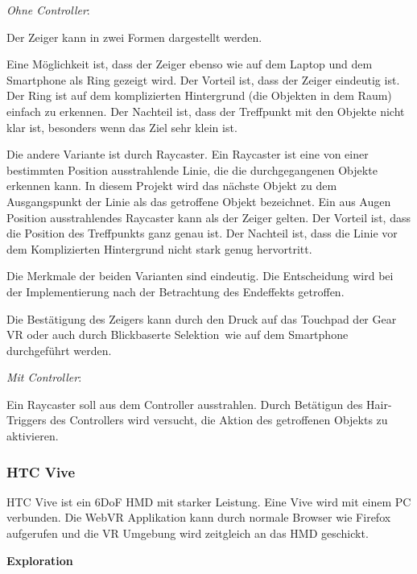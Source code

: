   \noindent
  \textsl{Ohne Controller}:
  \vspace{0.5em}
  
  \noindent
  Der Zeiger kann in zwei Formen dargestellt werden.
  
  Eine Möglichkeit ist, dass der Zeiger ebenso wie auf dem Laptop und dem Smartphone als Ring gezeigt wird. Der Vorteil ist, dass der Zeiger eindeutig ist. Der Ring ist auf dem komplizierten Hintergrund (die Objekten in dem Raum) einfach zu erkennen. Der Nachteil ist, dass der Treffpunkt mit den Objekte nicht klar ist, besonders wenn das Ziel sehr klein ist.
  
  Die andere Variante ist durch Raycaster. Ein Raycaster ist eine von einer bestimmten Position ausstrahlende Linie, die die durchgegangenen Objekte erkennen kann. In diesem Projekt wird das nächste Objekt zu dem Ausgangspunkt der Linie als das getroffene Objekt bezeichnet. Ein aus Augen Position ausstrahlendes Raycaster kann als der Zeiger gelten. Der Vorteil ist, dass die Position des Treffpunkts ganz genau ist. Der Nachteil ist, dass die Linie vor dem Komplizierten Hintergrund nicht stark genug hervortritt.
  
  Die Merkmale der beiden Varianten sind eindeutig. Die Entscheidung wird bei der Implementierung nach der Betrachtung des Endeffekts getroffen.
  
  Die Bestätigung des Zeigers kann durch den Druck auf das Touchpad der Gear VR oder auch durch \glqq Blickbaserte Selektion\grqq\ wie auf dem Smartphone durchgeführt werden.
  
  \vspace{0.5em}
  \noindent
  \textsl{Mit Controller}:
  \vspace{0.5em}
  
  \noindent
  Ein Raycaster soll aus dem Controller ausstrahlen. Durch Betätigun des Hair-Triggers des Controllers wird versucht, die Aktion des getroffenen Objekts zu aktivieren.
  
 \subsubsection{HTC Vive}
 HTC Vive ist ein 6DoF HMD mit starker Leistung. Eine Vive wird mit einem PC verbunden. Die WebVR Applikation kann durch normale Browser wie Firefox aufgerufen und die VR Umgebung wird zeitgleich an das HMD geschickt.
 
  \vspace{1em}
  \noindent
  \textbf{Exploration}
  \vspace{1em}
  
